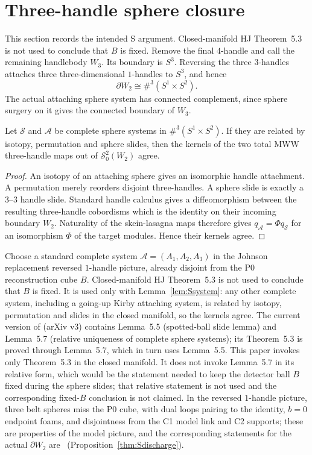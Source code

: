 \section{Three-handle sphere closure}\label{sec:s-closure}

This section records the intended S argument.  Closed-manifold HJ
Theorem~5.3 is not used to conclude that $B$ is fixed.  Remove the final $4$-handle and call the
remaining handlebody $W_3$.  Its boundary is $S^3$.  Reversing the three
$3$-handles attaches three three-dimensional $1$-handles to $S^3$, and hence
\[
\partial W_2\cong\#^3(S^1\times S^2).
\]
The actual attaching sphere system has connected complement, since sphere
surgery on it gives the connected boundary of $W_3$.

\begin{lemma}
\label{lem:Ssystem}
Let \(\mathcal S\) and \(\mathcal A\) be complete sphere systems in
\(\#^3(S^1\times S^2)\).  If they are related by isotopy, permutation and
sphere slides, then the kernels of the two total MWW three-handle maps out of
\(\mathcal S^2_0(W_2)\) agree.
\end{lemma}

\begin{proof}
An isotopy of an attaching sphere gives an isomorphic handle attachment.
A permutation merely reorders disjoint three-handles.  A sphere slide is
exactly a \(3\)--\(3\) handle slide.  Standard handle calculus gives a
diffeomorphism between the resulting three-handle cobordisms which is the
identity on their incoming boundary \(W_2\).  Naturality of the skein-lasagna
maps therefore gives \(q_{\mathcal A}=\Phi q_{\mathcal S}\) for an
isomorphism \(\Phi\) of the target modules.  Hence their kernels agree.
\end{proof}

Choose a standard complete system
\(\mathcal A=(A_1,A_2,A_3)\) in the Johnson replacement reversed
$1$-handle picture, already disjoint from the P0 reconstruction cube $B$.
Closed-manifold HJ Theorem~5.3 is not used to conclude that $B$ is fixed.
It is used only with Lemma~\ref{lem:Ssystem}: any other complete system,
including a going-up Kirby attaching system, is related by isotopy,
permutation and slides in the closed manifold, so the kernels agree.
The current version of \cite{HorvatJablonowski2025} (arXiv v3) contains
Lemma~5.5 (spotted-ball slide lemma) and Lemma~5.7 (relative uniqueness of
complete sphere systems); its Theorem~5.3 is proved through Lemma~5.7,
which in turn uses Lemma~5.5.  This paper invokes only Theorem~5.3 in the
closed manifold.  It does not invoke Lemma~5.7 in its relative form, which
would be the statement needed to keep the detector ball $B$ fixed during
the sphere slides; that relative statement is not used and the
corresponding fixed-$B$ conclusion is not claimed.
In the reversed $1$-handle picture, three belt spheres miss the P0 cube,
with dual loops pairing to the identity, $b=0$ endpoint foams, and
disjointness from the C1 model link and C2 supports; these are properties
of the model picture, and the corresponding statements for the actual
$\partial W_2$ are \Open\ (Proposition~\ref{thm:Sdischarge}).

